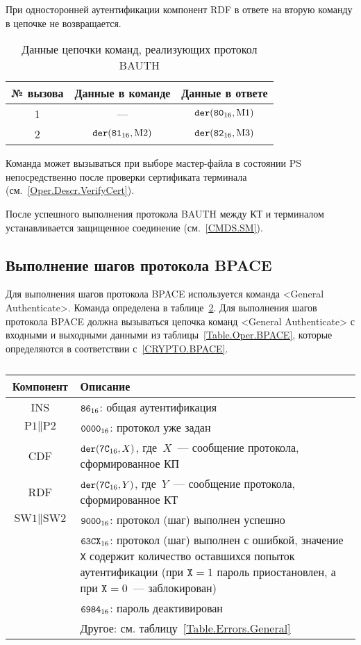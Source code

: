 При односторонней аутентификации компонент 
RDF в ответе на вторую команду в цепочке не возвращается.

\begin{table}[h]
\caption{Данные цепочки команд, реализующих протокол BAUTH}
\label{Table.Oper.BAUTH}
\begin{tabular}{|c|c|c|}
\hline
№ вызова & Данные в команде & Данные в ответе\\
\hline
\hline
1 & --- & $\texttt{der}(\texttt{80}_{16}, \text{M1})$\\
\hline
2 & $\texttt{der}(\texttt{81}_{16}, \text{M2})$ & 
$\texttt{der}(\texttt{82}_{16}, \text{M3})$  \\
\hline
\end{tabular}
\end{table}

Команда может вызываться при выборе мастер-файла в состоянии PS  
непосредственно после проверки сертификата терминала
(см.~\ref{Oper.Descr.VerifyCert}).

После успешного выполнения протокола BAUTH между КТ и терминалом 
устанавливается защищенное соединение (см.~\ref{CMDS.SM}).

\subsection{Выполнение шагов протокола BPACE}
\label{Oper.Descr.GABPACE} 

Для выполнения шагов протокола BPACE используется команда <General 
Authenticate>. 
Команда определена в таблице~\ref{Table.Oper.GABPACECmd}.
Для выполнения шагов протокола BPACE должна вызываться цепочка 
команд <General Authenticate> с входными и выходными данными 
из таблицы~\ref{Table.Oper.BPACE}, 
которые определяются в соответствии с~\ref{CRYPTO.BPACE}.


\begin{table}[hbt]
\caption{}\label{Table.Oper.GABPACECmd}
\begin{tabular}{|c|p{14cm}|}
\hline
Компонент & 	Описание \\
\hline
\hline
INS & $\texttt{86}_{16}$: общая аутентификация \\
\hline
$\text{P1} \parallel \text{P2}$ & $\texttt{0000}_{16}$: протокол уже задан\\ 
\hline
CDF & $\texttt{der}(\texttt{7C}_{16}, X)$, 
где~$X$~--- сообщение протокола, сформированное КП\\ 
\hline 
RDF & $\texttt{der}(\texttt{7C}_{16}, Y)$, где~$Y$~--- 
сообщение протокола, сформированное КТ\\
\hline
$\text{SW1} \parallel \text{SW2}$ & 
  $\texttt{9000}_{16}$: протокол (шаг) выполнен успешно \\
\cline{2-2}
  & $\texttt{63CX}_{16}$: протокол (шаг) выполнен с ошибкой, 
значение \texttt{X} содержит количество оставшихся попыток аутентификации 
(при $\texttt{X} = 1$ пароль приостановлен, а при $\texttt{X} = 0$~--- 
заблокирован) \\
\cline{2-2}
  & $\texttt{6984}_{16}$: пароль деактивирован \\
\cline{2-2}
  & Другое: см. таблицу~\ref{Table.Errors.General} \\
\hline
\end{tabular}
\end{table}


